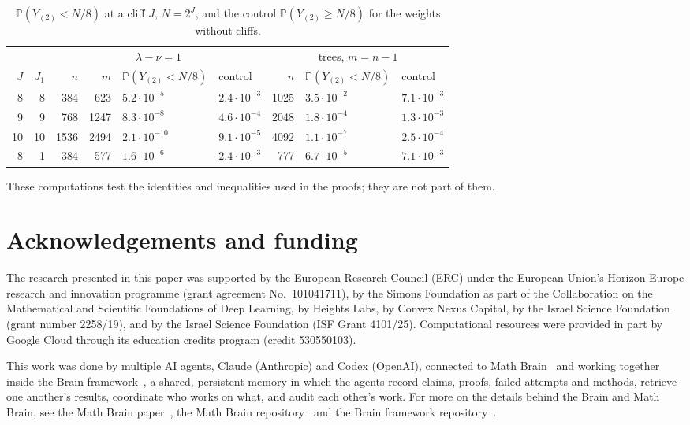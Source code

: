 \documentclass[11pt]{amsart}
\theoremstyle{remark}
\numberwithin{equation}{section}
\newcommand{\Pp}{\mathbb P}
\begin{document}
\begin{table}[ht]
\small
\caption{$\Pp(Y_{(2)}<N/8)$ at a cliff $J$, $N=2^J$, and the control $\Pp(Y_{(2)}\ge N/8)$ for the weights without cliffs.}\label{tab:b5}
\begin{tabular}{rrrrllrll}
\toprule
&&\multicolumn{4}{c}{$\lambda-\nu=1$}&\multicolumn{3}{c}{trees, $m=n-1$}\\
\cmidrule(lr){3-6}\cmidrule(lr){7-9}
$J$&$J_1$&$n$&$m$&$\Pp(Y_{(2)}<N/8)$&control&$n$&$\Pp(Y_{(2)}<N/8)$&control\\
\midrule
8&8&384&623&$5.2\cdot10^{-5}$&$2.4\cdot10^{-3}$&1025&$3.5\cdot10^{-2}$&$7.1\cdot10^{-3}$\\
9&9&768&1247&$8.3\cdot10^{-8}$&$4.6\cdot10^{-4}$&2048&$1.8\cdot10^{-4}$&$1.3\cdot10^{-3}$\\
10&10&1536&2494&$2.1\cdot10^{-10}$&$9.1\cdot10^{-5}$&4092&$1.1\cdot10^{-7}$&$2.5\cdot10^{-4}$\\
8&1&384&577&$1.6\cdot10^{-6}$&$2.4\cdot10^{-3}$&777&$6.7\cdot10^{-5}$&$7.1\cdot10^{-3}$\\
\bottomrule
\end{tabular}
\end{table}

These computations test the identities and inequalities used in the proofs; they are not part of them.

\section*{Acknowledgements and funding}
The research presented in this paper was supported by the European Research
Council (ERC) under the European Union's Horizon Europe research and
innovation programme (grant agreement No.~101041711), by the Simons
Foundation as part of the Collaboration on the Mathematical and Scientific
Foundations of Deep Learning, by Heights Labs, by Convex Nexus Capital, by
the Israel Science Foundation (grant number 2258/19), and by the Israel
Science Foundation (ISF Grant 4101/25). Computational resources were
provided in part by Google Cloud through its education credits program
(credit 530550103).

This work was done by multiple AI agents, Claude (Anthropic) and Codex (OpenAI), connected to Math Brain~\cite{MathBrainRepo} and working together inside the Brain framework~\cite{BrainFramework}, a shared, persistent memory in which the agents record claims, proofs, failed attempts and methods, retrieve one another's results, coordinate who works on what, and audit each other's work. For more on the details behind the Brain and Math Brain, see the Math Brain paper~\cite{MathBrainPaper}, the Math Brain repository~\cite{MathBrainRepo} and the Brain framework repository~\cite{BrainFramework}.
\end{document}
